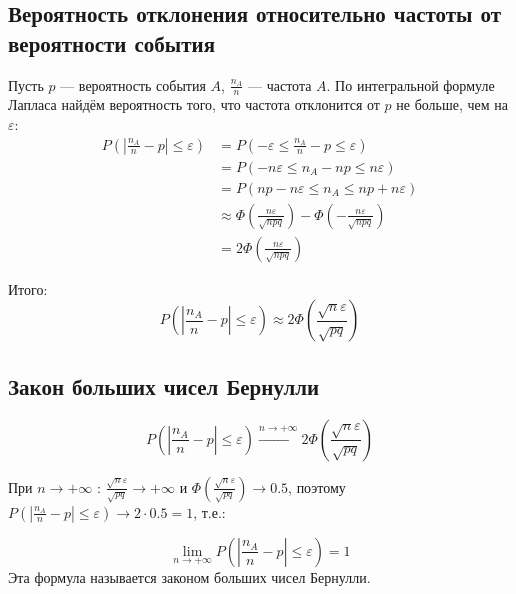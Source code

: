\documentclass[12pt, a4paper, oneside]{book}
\begin{document}
\subsection{Вероятность отклонения относительно частоты от вероятности события}

Пусть \(p\) --- вероятность события \(A\), \(\frac{n_A}{n}\) --- частота \(A\). По интегральной формуле Лапласа найдём вероятность того, что частота отклонится от \(p\) не больше, чем на \(\varepsilon\):
\begin{align*}
    P\left(\left|\frac{n_A}{n} - p\right| \leq \varepsilon\right) & = P( - \varepsilon \leq \frac{n_A}{n} - p \leq \varepsilon)                                                      \\
                                                                  & = P( - n\varepsilon \leq n_A - np \leq n\varepsilon)                                                             \\
                                                                  & = P( np - n\varepsilon \leq n_A \leq np + n\varepsilon)                                                          \\
                                                                  & \approx \Phi\left( \frac{n\varepsilon}{\sqrt{npq}} \right) - \Phi\left( -\frac{n\varepsilon}{\sqrt{npq}} \right) \\
                                                                  & = 2\Phi\left( \frac{n\varepsilon}{\sqrt{npq}} \right)
\end{align*}

Итого:
\[P\left(\left|\frac{n_A}{n} - p\right| \leq \varepsilon\right) \approx 2\Phi\left( \frac{\sqrt{n}\varepsilon}{\sqrt{pq}} \right)\]

\subsection{Закон больших чисел Бернулли}

\[P\left(\left|\frac{n_A}{n} - p\right| \leq \varepsilon\right) \xrightarrow{n \to +\infty} 2\Phi\left( \frac{\sqrt{n}\varepsilon}{\sqrt{pq}} \right)\]

При \(n \to +\infty\) : \(\frac{\sqrt{n}\varepsilon}{\sqrt{pq}} \to +\infty\) и \(\Phi\left( \frac{\sqrt{n}\varepsilon}{\sqrt{pq}} \right) \to 0.5\), поэтому \(P\left(\left|\frac{n_A}{n} - p\right| \leq \varepsilon\right) \to 2\cdot 0.5 = 1\), т.е.:

\[\lim_{n \to +\infty} P\left(\left|\frac{n_A}{n} - p\right| \leq \varepsilon\right) = 1\]
Эта формула называется законом больших чисел Бернулли.
\end{document}
